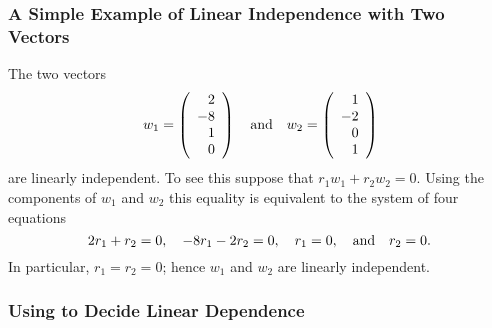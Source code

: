 \documentclass{ximera}
\begin{document}
\subsubsection*{A Simple Example of Linear Independence with Two Vectors}

The two vectors
\[
w_1 = \left(\begin{array}{r} 2 \\ -8\\ 1\\ 0 \end{array}\right)
\quad\mbox{and}\quad
w_2 = \left(\begin{array}{r} 1 \\ -2\\ 0\\ 1 \end{array}\right)
\]
are linearly independent.  To see this suppose that
$r_1 w_1 + r_2 w_2 = 0$.  Using the components of $w_1$ and $w_2$
this equality is equivalent to the system of four equations
\[
2r_1 + r_2 = 0,\quad -8r_1 - 2r_2 = 0,\quad r_1 = 0, \quad\mbox{and}\quad r_2 = 0.
\]
In particular, $r_1 = r_2 = 0$; hence $w_1$ and $w_2$ are
linearly independent.


\subsubsection*{Using \Matlab to Decide Linear Dependence}
\end{document}
